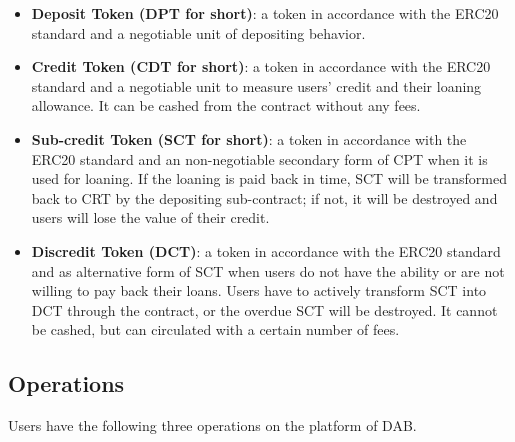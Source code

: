 \documentclass[a4paper, 10pt, conference]{ieeeconf} %
\begin{document}
\begin{itemize} 
   \item \textbf{Deposit Token (DPT for short)}: a token in accordance with the ERC20 standard and a negotiable unit of depositing behavior.
   \item  \textbf{Credit Token (CDT for short)}: a token in accordance with the ERC20 standard and a negotiable unit to measure users' credit and their loaning allowance. It can be cashed from the contract without any fees.
   \item  \textbf{Sub-credit Token (SCT for short)}: a token in accordance with the ERC20 standard and an non-negotiable secondary form of CPT when it is used for loaning. If the loaning is paid back in time, SCT will be transformed back to CRT by the depositing sub-contract; if not, it will be destroyed and users will lose the value of their credit.
   \item \textbf{Discredit Token (DCT)}: a token in accordance with the ERC20 standard and as alternative form of SCT when users do not have the ability or are not willing to pay back their loans. Users have to actively transform SCT into DCT through the contract, or the overdue SCT will be destroyed. It cannot be cashed, but can circulated with a certain number of fees.
\end{itemize}

\subsection{Operations}
Users have the following three operations on the platform of DAB.
\end{document}
